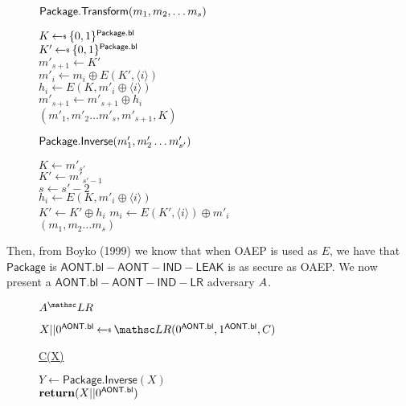 \documentclass[11pt,twoside]{article}
\begin{document}
\begin{figure}[H]
{
\underline{$\mathsf{Package.Transform}(m_1,m_2,\dots m_s)$}

\begin{algorithm}[H]
$K\getsr \bits^\schemefont{Package.bl}$\\
$K'\getsr \bits^\schemefont{Package.bl}$\\
$m'_{s+1}\gets K'$\\
{
$m'_i\gets m_i \oplus E(K',\langle i \rangle)$\\
$h_i\gets E(K,m'_i\oplus \langle i \rangle)$\\
$m'_{s+1}\gets m'_{s+1}\oplus h_i$\\
}
\Return $(m'_1,m'_2\dots m'_s, m'_{s+1}, K)$
\end{algorithm}
}
{
\underline{$\mathsf{Package.Inverse}(m'_1,m'_2\dots m'_{s'})$}

\begin{algorithm}[H]
$K\gets m'_{s'}$\\
$K'\gets m'_{s'-1}$\\
$s\gets s'-2$\\
{
$h_i\gets E(K,m'_i\oplus \langle i\rangle )$\\
$K'\gets K'\oplus h_i$
}
{
$m_i\gets E(K',\langle i\rangle)\oplus m'_i$\\
}
\Return $(m_1,m_2\dots m_{s})$
\end{algorithm}
}
\end{figure} 

Then, from Boyko (1999) we know that when OAEP is used as $E$, we have that $\mathsf{Package}$ is $\mathsf{AONT.bl-AONT-IND-LEAK}$ is as secure as OAEP. We now present a $\mathsf{AONT.bl-AONT-IND-LR}$ adversary $A$. 

\begin{figure}[H]
{
\underline{$\advA^\LRO$}

\begin{algorithm}[H]
$X||0^\mathsf{AONT.bl} \getsr \LRO(0^\mathsf{AONT.bl},1^\mathsf{AONT.bl},C)$\\
\end{algorithm}

\underline{C(X)}

\begin{algorithm}[H]
$Y\gets\mathsf{Package.Inverse}(X)$\\
$\Return (X||0^\mathsf{AONT.bl})$\\
\end{algorithm}
}
\end{figure}
\end{document}
